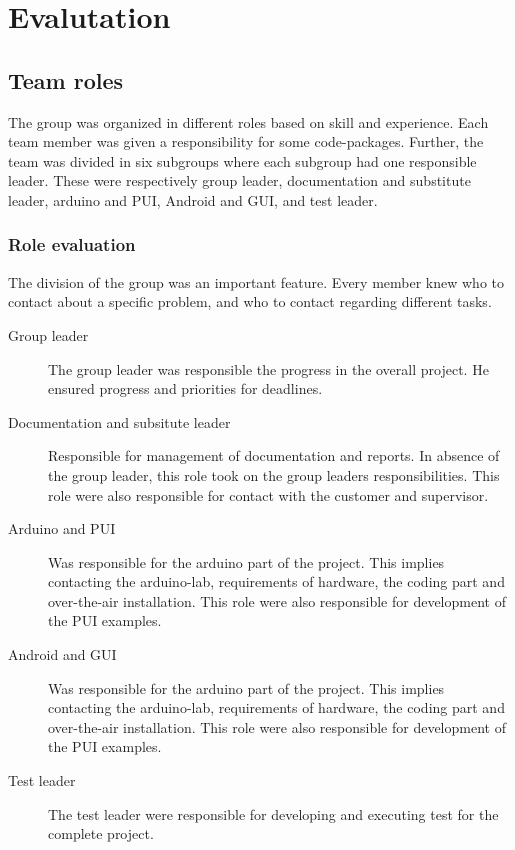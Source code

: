 \section{Evalutation}
\subsection{Team roles}
The group was organized in different roles based on skill and experience. Each team member was given a responsibility for some code-packages. Further, the team was divided in six subgroups where each subgroup had one responsible leader. These were respectively group leader, documentation and substitute leader, arduino and PUI, Android and GUI, and test leader.

\subsubsection{Role evaluation}
The division of the group was an important feature. Every member knew who to contact about a specific problem, and who to contact regarding different tasks.
\begin{description}
	\item[Group leader]{The group leader was responsible the progress in the overall project. He ensured progress and priorities for deadlines.}
	\item[Documentation and subsitute leader]{Responsible for management of documentation and reports. In absence of the group leader, this role took on the group leaders responsibilities. This role were also responsible for contact with the customer and supervisor. }
	\item[Arduino and PUI]{Was responsible for the arduino part of the project. This implies contacting the arduino-lab, requirements of hardware, the coding part and over-the-air installation. This role were also responsible for development of the PUI examples.
}
	\item[Android and GUI]{Was responsible for the arduino part of the project. This implies contacting the arduino-lab, requirements of hardware, the coding part and over-the-air installation. This role were also responsible for development of the PUI examples.
}
	\item[Test leader]{The test leader were responsible for developing and executing test for the complete project.}
\end{description}
